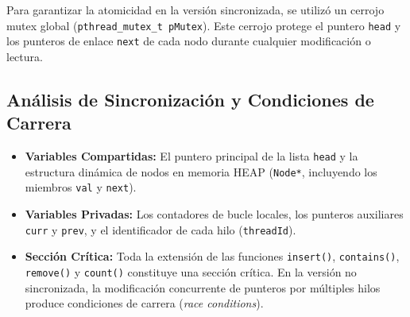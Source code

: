 \documentclass[11pt,a4paper]{article}
\begin{document}
Para garantizar la atomicidad en la versión sincronizada, se utilizó un cerrojo mutex global (\texttt{pthread\_mutex\_t pMutex}). Este cerrojo protege el puntero \texttt{head} y los punteros de enlace \texttt{next} de cada nodo durante cualquier modificación o lectura.

\subsection{Análisis de Sincronización y Condiciones de Carrera}
\begin{itemize}
    \item \textbf{Variables Compartidas:} El puntero principal de la lista \texttt{head} y la estructura dinámica de nodos en memoria HEAP (\texttt{Node*}, incluyendo los miembros \texttt{val} y \texttt{next}).
    \item \textbf{Variables Privadas:} Los contadores de bucle locales, los punteros auxiliares \texttt{curr} y \texttt{prev}, y el identificador de cada hilo (\texttt{threadId}).
    \item \textbf{Sección Crítica:} Toda la extensión de las funciones \texttt{insert()}, \texttt{contains()}, \texttt{remove()} y \texttt{count()} constituye una sección crítica. En la versión no sincronizada, la modificación concurrente de punteros por múltiples hilos produce condiciones de carrera (\textit{race conditions}).
\end{itemize}
\end{document}
